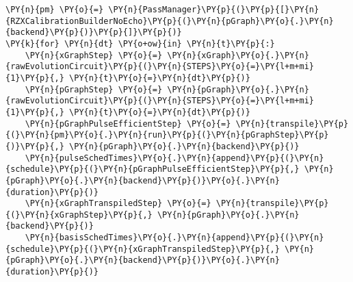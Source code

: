     \begin{tcolorbox}[breakable, size=fbox, boxrule=1pt, pad at break*=1mm,colback=cellbackground, colframe=cellborder]
\begin{Verbatim}[commandchars=\\\{\}]
\PY{n}{pm} \PY{o}{=} \PY{n}{PassManager}\PY{p}{(}\PY{p}{[}\PY{n}{RZXCalibrationBuilderNoEcho}\PY{p}{(}\PY{n}{pGraph}\PY{o}{.}\PY{n}{backend}\PY{p}{)}\PY{p}{]}\PY{p}{)}
\PY{k}{for} \PY{n}{dt} \PY{o+ow}{in} \PY{n}{t}\PY{p}{:}
    \PY{n}{xGraphStep} \PY{o}{=} \PY{n}{xGraph}\PY{o}{.}\PY{n}{rawEvolutionCircuit}\PY{p}{(}\PY{n}{STEPS}\PY{o}{=}\PY{l+m+mi}{1}\PY{p}{,} \PY{n}{t}\PY{o}{=}\PY{n}{dt}\PY{p}{)}
    \PY{n}{pGraphStep} \PY{o}{=} \PY{n}{pGraph}\PY{o}{.}\PY{n}{rawEvolutionCircuit}\PY{p}{(}\PY{n}{STEPS}\PY{o}{=}\PY{l+m+mi}{1}\PY{p}{,} \PY{n}{t}\PY{o}{=}\PY{n}{dt}\PY{p}{)}
    \PY{n}{pGraphPulseEfficientStep} \PY{o}{=} \PY{n}{transpile}\PY{p}{(}\PY{n}{pm}\PY{o}{.}\PY{n}{run}\PY{p}{(}\PY{n}{pGraphStep}\PY{p}{)}\PY{p}{,} \PY{n}{pGraph}\PY{o}{.}\PY{n}{backend}\PY{p}{)}
    \PY{n}{pulseSchedTimes}\PY{o}{.}\PY{n}{append}\PY{p}{(}\PY{n}{schedule}\PY{p}{(}\PY{n}{pGraphPulseEfficientStep}\PY{p}{,} \PY{n}{pGraph}\PY{o}{.}\PY{n}{backend}\PY{p}{)}\PY{o}{.}\PY{n}{duration}\PY{p}{)}
    \PY{n}{xGraphTranspiledStep} \PY{o}{=} \PY{n}{transpile}\PY{p}{(}\PY{n}{xGraphStep}\PY{p}{,} \PY{n}{pGraph}\PY{o}{.}\PY{n}{backend}\PY{p}{)}
    \PY{n}{basisSchedTimes}\PY{o}{.}\PY{n}{append}\PY{p}{(}\PY{n}{schedule}\PY{p}{(}\PY{n}{xGraphTranspiledStep}\PY{p}{,} \PY{n}{pGraph}\PY{o}{.}\PY{n}{backend}\PY{p}{)}\PY{o}{.}\PY{n}{duration}\PY{p}{)}
\end{Verbatim}
\end{tcolorbox}

